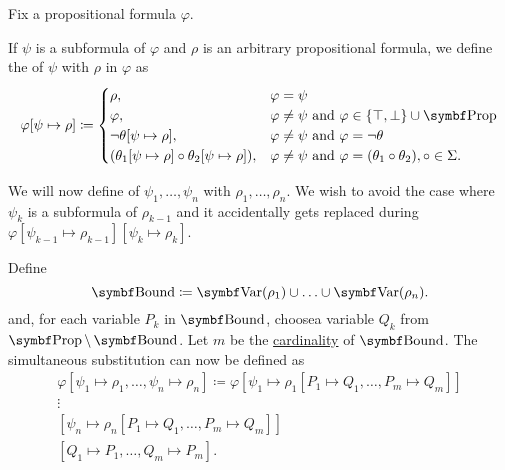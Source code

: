 \begin{definition}\label{def:propositional_substition}
  Fix a propositional formula \( \varphi \).

  \begin{DefEnum}
     If \( \psi \) is a subformula of \( \varphi \) and \( \rho \) is an arbitrary propositional formula, we define the  of \( \psi \) with \( \rho \) in \( \varphi \) as
    \begin{equation*}
      \varphi[\psi \mapsto \rho] \coloneqq \begin{cases}
        \rho,                                                            &\varphi = \psi                                                                        \\
        \varphi,                                                         &\varphi \neq \psi \text{ and } \varphi \in \{ \top, \bot \} \cup \Bold{Prop}          \\
        \neg \theta[\psi \mapsto \rho],                                  &\varphi \neq \psi \text{ and } \varphi = \neg \theta                                  \\
        (\theta_1[\psi \mapsto \rho] \circ \theta_2[\psi \mapsto \rho]), &\varphi \neq \psi \text{ and } \varphi = (\theta_1 \circ \theta_2), \circ \in \Sigma.
      \end{cases}
    \end{equation*}

     We will now define  of \( \psi_1, \ldots, \psi_n \) with \( \rho_1, \ldots, \rho_n \). We wish to avoid the case where \( \psi_k \) is a subformula of \( \rho_{k-1} \) and it accidentally gets replaced during \( \varphi[\psi_{k-1} \mapsto \rho_{k-1}][\psi_k \mapsto \rho_k] \).

    Define
    \begin{equation*}
      \Cat{Bound} \coloneqq \Bold{Var}(\rho_1) \cup \ldots \cup \Bold{Var}(\rho_n).
    \end{equation*}
    and, for each variable \( P_k \) in \( \Cat{Bound} \), choose\AOC a variable \( Q_k \) from \( \Bold{Prop} \setminus \Bold{Bound} \). Let \( m \) be the \hyperref[def:cardinal]{cardinality} of \( \Bold{Bound} \). The simultaneous substitution can now be defined as
    \begin{align*}
      \varphi[\psi_1 \mapsto \rho_1, \ldots, \psi_n \mapsto \rho_n] \coloneqq \varphi
      [\psi_1 \mapsto \rho_1[P_1 \mapsto Q_1, \ldots, P_m \mapsto Q_m]] \\
      \vdots \hspace{3cm} \\
      [\psi_n \mapsto \rho_n[P_1 \mapsto Q_1, \ldots, P_m \mapsto Q_m]] \\
      [Q_1 \mapsto P_1, \ldots, Q_m \mapsto P_m].
    \end{align*}
  \end{DefEnum}
\end{definition}

